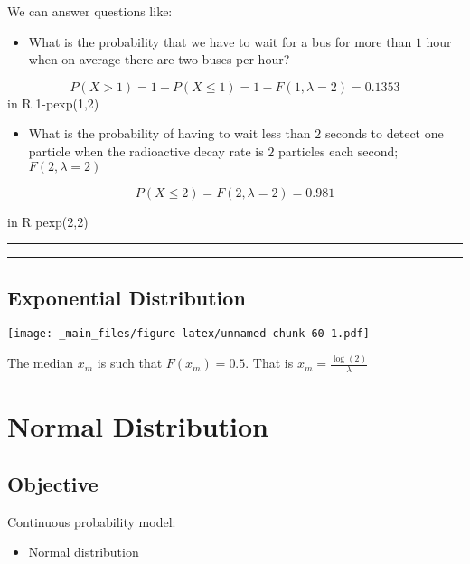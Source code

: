 \documentclass[
]{book}
\providecommand{\tightlist}{%
  \setlength{\itemsep}{0pt}\setlength{\parskip}{0pt}}
\begin{document}
We can answer questions like:

\begin{itemize}
\tightlist
\item
  What is the probability that we have to wait for a bus for more than \(1\) hour when on average there are two buses per hour?
\end{itemize}

\[P(X > 1)=1-P(X \le 1) = 1-F(1,\lambda=2)=0.1353\]
in R 1-pexp(1,2)

\begin{itemize}
\tightlist
\item
  What is the probability of having to wait less than \(2\) seconds to detect one particle when the radioactive decay rate is \(2\) particles each second; \(F(2,\lambda=2)\)
\end{itemize}

\[P(X \le 2)=F(2,\lambda=2)=0.981\]

in R pexp(2,2)

\begin{center}\rule{0.5\linewidth}{0.5pt}\end{center}

\begin{center}\rule{0.5\linewidth}{0.5pt}\end{center}

\hypertarget{exponential-distribution-2}{%
\section{Exponential Distribution}\label{exponential-distribution-2}}

\texttt{[image: \_main\_files/figure-latex/unnamed-chunk-60-1.pdf]}

The median \(x_m\) is such that \(F(x_m)=0.5\). That is \(x_m=\frac{\log(2)}{\lambda}\)

\hypertarget{normal-distribution}{%
\chapter{Normal Distribution}\label{normal-distribution}}

\hypertarget{objective-7}{%
\section{Objective}\label{objective-7}}

Continuous probability model:

\begin{itemize}
\tightlist
\item
  Normal distribution
\end{itemize}
\end{document}
